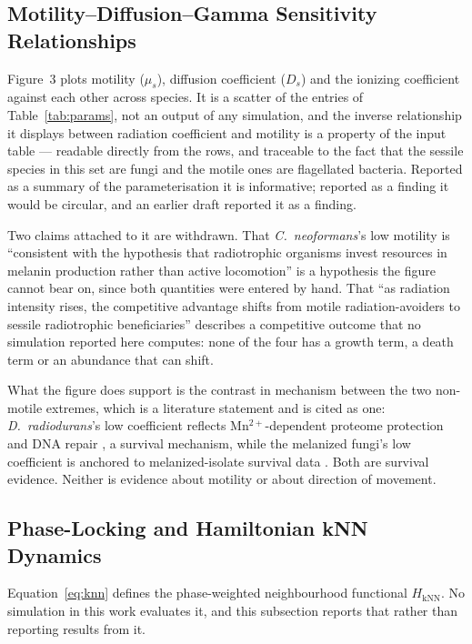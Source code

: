\documentclass[11pt]{article}
\begin{document}
\subsection{Motility--Diffusion--Gamma Sensitivity Relationships}

Figure~3 plots motility ($\mu_s$), diffusion coefficient ($D_s$) and the ionizing coefficient
against each other across species. It is a scatter of the entries of Table~\ref{tab:params}, not an
output of any simulation, and the inverse relationship it displays between radiation coefficient
and motility is a property of the input table --- readable directly from the rows, and traceable to
the fact that the sessile species in this set are fungi and the motile ones are flagellated
bacteria. Reported as a summary of the parameterisation it is informative; reported as a finding it
would be circular, and an earlier draft reported it as a finding.

Two claims attached to it are withdrawn. That \textit{C.\ neoformans}'s low motility is
``consistent with the hypothesis that radiotrophic organisms invest resources in melanin production
rather than active locomotion'' is a hypothesis the figure cannot bear on, since both quantities
were entered by hand. That ``as radiation intensity rises, the competitive advantage shifts from
motile radiation-avoiders to sessile radiotrophic beneficiaries'' describes a competitive outcome
that no simulation reported here computes: none of the four has a growth term, a death term or an
abundance that can shift.

What the figure does support is the contrast in mechanism between the two non-motile extremes,
which is a literature statement and is cited as one: \textit{D.\ radiodurans}'s low coefficient
reflects Mn$^{2+}$-dependent proteome protection and DNA repair \cite{daly2010,slade2011}, a
survival mechanism, while the melanized fungi's low coefficient is anchored to melanized-isolate
survival data \cite{zhdanova2000,shunk2022}. Both are survival evidence. Neither is evidence about
motility or about direction of movement.

\subsection{Phase-Locking and Hamiltonian kNN Dynamics}

Equation~\ref{eq:knn} defines the phase-weighted neighbourhood functional $H_{\mathrm{kNN}}$. No
simulation in this work evaluates it, and this subsection reports that rather than reporting
results from it.
\end{document}
